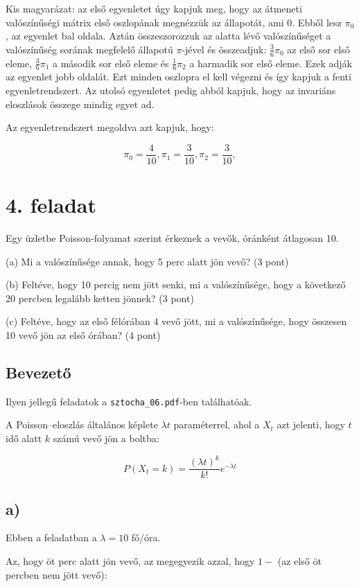 \documentclass[a4paper,12pt]{article}
\begin{document}
Kis magyarázat: az első egyenletet úgy kapjuk meg, hogy az átmeneti
valószínűségi mátrix első oszlopának megnézzük az állapotát, ami 0.
Ebből lesz $\pi_0$, az egyenlet bal oldala. Aztán összeszorozzuk az 
alatta lévő valószínűséget a valószínűség sorának megfelelő állapotú
$\pi$-jével és összeadjuk: $\frac{3}{6} \pi_0$ az első sor első eleme,
$\frac{3}{6} \pi_1$ a második sor első eleme és $\frac{1}{6} \pi_2$
a harmadik sor első eleme. Ezek adják az egyenlet jobb oldalát.
Ezt minden oszlopra el kell végezni és így kapjuk a fenti 
egyenletrendszert. Az utolsó egyenletet pedig abból kapjuk, hogy az
invariáns eloszlások összege mindig egyet ad.

Az egyenletrendszert megoldva azt kapjuk, hogy:

\[
\pi_0 = \frac{4}{10},
\pi_1 = \frac{3}{10},
\pi_2 = \frac{3}{10},
\]

\pagebreak
\section*{4. feladat}
Egy üzletbe Poisson-folyamat szerint érkeznek a vevők, óránként 
átlagosan 10.

(a) Mi a valószínűsége annak, hogy 5 perc alatt jön vevő? (3 pont)

(b) Feltéve, hogy 10 percig nem jött senki, mi a valószínűsége, hogy a
következő 20 percben legalább ketten jönnek? (3 pont)

(c) Feltéve, hogy az első félórában 4 vevő jött, mi a valószínűsége, 
hogy összesen 10 vevő jön az első órában? (4 pont)

\subsection*{Bevezető}
Ilyen jellegű feladatok a \texttt{sztocha\_06.pdf}-ben találhatóak.

A Poisson--eloszlás általános képlete $\lambda t$ paraméterrel, ahol a
$X_t$ azt jelenti, hogy $t$ idő alatt $k$ számú vevő jön a boltba:

\[
P(X_t = k) = \frac{\left(\lambda t\right)^k}{k!}e^{-\lambda t} 
\]

\subsection*{a)}
Ebben a feladatban a $\lambda = 10$ fő/óra.

Az, hogy öt perc alatt jön vevő, az megegyezik azzal, hogy $1-$ (az első
öt percben nem jött vevő):
\end{document}
